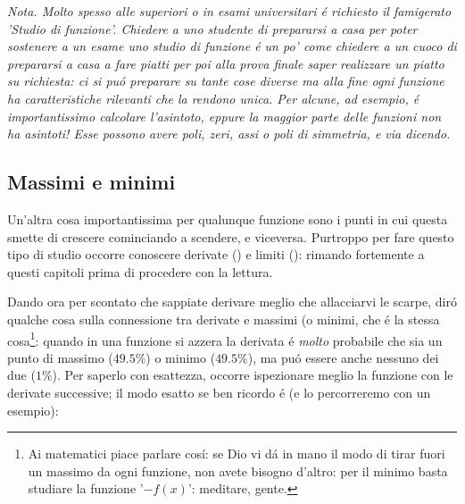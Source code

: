 \em{Nota}. Molto spesso alle superiori o in esami universitari \'e richiesto il famigerato 'Studio di funzione'. Chiedere a uno studente di prepararsi
a casa per poter sostenere a un esame uno studio di funzione \'e un po' come chiedere a un cuoco di prepararsi a casa a fare piatti per poi
alla prova finale saper realizzare un piatto su richiesta: ci si pu\'o preparare su tante cose diverse ma alla fine ogni funzione ha caratteristiche
rilevanti che la rendono unica. Per alcune, ad esempio, \'e importantissimo calcolare l'asintoto, eppure la maggior parte delle funzioni non ha asintoti! 
Esse possono avere poli, zeri, assi o poli di simmetria, e via dicendo.

\label{massimiminimi}
\subsection{Massimi e minimi}

Un'altra cosa importantissima per qualunque funzione sono i punti in cui questa smette di crescere cominciando a scendere,
e viceversa. Purtroppo per fare questo tipo di studio occorre conoscere derivate () e limiti ():
rimando fortemente a questi capitoli prima di procedere con la lettura. 

Dando ora per scontato che sappiate derivare meglio che allacciarvi le scarpe, dir\'o qualche cosa sulla connessione
tra derivate e massimi (o minimi, che \'e la stessa cosa\footnote{Ai matematici piace parlare cos\'i: se Dio vi d\'a
in mano il modo di tirar fuori un massimo da ogni funzione, non avete bisogno d'altro: per il minimo basta studiare la
funzione '$-f(x)$': meditare, gente.}: quando in una funzione si azzera la derivata \'e {\em molto} probabile che sia un
punto di massimo ($49.5\%$) o minimo ($49.5\%$), ma pu\'o essere anche nessuno dei due ($1\%$). Per saperlo con esattezza,
occorre ispezionare meglio la funzione con le derivate successive; il modo esatto se ben ricordo \'e (e lo percorreremo
con un esempio):

